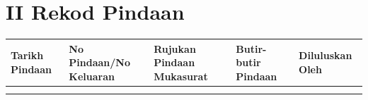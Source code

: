 \documentclass[
]{article}
\begin{document}
\hypertarget{ii-rekod-pindaan}{%
\section{II Rekod Pindaan}\label{ii-rekod-pindaan}}

\begin{longtable}[]{@{}lllll@{}}
\toprule
\begin{minipage}[b]{0.17\columnwidth}\raggedright
Tarikh Pindaan\strut
\end{minipage} & \begin{minipage}[b]{0.17\columnwidth}\raggedright
No Pindaan/No Keluaran\strut
\end{minipage} & \begin{minipage}[b]{0.17\columnwidth}\raggedright
Rujukan Pindaan Mukasurat\strut
\end{minipage} & \begin{minipage}[b]{0.17\columnwidth}\raggedright
Butir-butir Pindaan\strut
\end{minipage} & \begin{minipage}[b]{0.17\columnwidth}\raggedright
Diluluskan Oleh\strut
\end{minipage}\tabularnewline
\midrule
\endhead
\begin{minipage}[t]{0.17\columnwidth}\raggedright
\strut
\end{minipage} & \begin{minipage}[t]{0.17\columnwidth}\raggedright
\strut
\end{minipage} & \begin{minipage}[t]{0.17\columnwidth}\raggedright
\strut
\end{minipage} & \begin{minipage}[t]{0.17\columnwidth}\raggedright
\strut
\end{minipage} & \begin{minipage}[t]{0.17\columnwidth}\raggedright
\strut
\end{minipage}\tabularnewline
\begin{minipage}[t]{0.17\columnwidth}\raggedright
\strut
\end{minipage} & \begin{minipage}[t]{0.17\columnwidth}\raggedright
\strut
\end{minipage} & \begin{minipage}[t]{0.17\columnwidth}\raggedright
\strut
\end{minipage} & \begin{minipage}[t]{0.17\columnwidth}\raggedright
\strut

\end{minipage}
\end{longtable}
\end{document}
